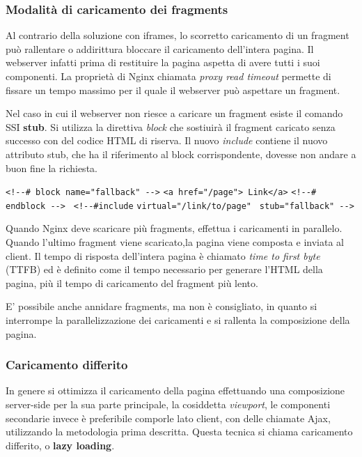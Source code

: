 \subsubsection*{Modalità di caricamento dei fragments}
Al contrario della soluzione con iframes, lo scorretto caricamento di un fragment può rallentare o addirittura bloccare 
il caricamento dell'intera pagina. Il webserver infatti prima di restituire la pagina aspetta di avere tutti  i suoi componenti.
La proprietà di Nginx chiamata \emph{proxy read timeout} permette di fissare un tempo massimo per il quale il webserver 
può aspettare un fragment.

Nel caso in cui il webserver non riesce a caricare un fragment esiste il comando SSI \textbf{stub}.
Si utilizza la direttiva \emph{block} che sostiuirà il fragment caricato senza successo con del codice HTML di riserva.
Il nuovo \emph{include} contiene il nuovo attributo stub, che ha il riferimento al block corrispondente, dovesse non andare
a buon fine la richiesta.


\verb|<!--# block name="fallback" -->|\linebreak
\verb|<a href="/page"> Link</a>|\linebreak
\verb|<!--# endblock -->|\linebreak
\verb| <!--#include|\linebreak
\verb|virtual="/link/to/page"|\linebreak
\verb| stub="fallback" -->|\linebreak

\linebreak
Quando Nginx deve scaricare più fragments, effettua i caricamenti in parallelo.
Quando l'ultimo fragment viene scaricato,la pagina viene composta e inviata al client.
Il tempo di risposta dell'intera pagina è chiamato \emph{time to first byte} (TTFB) ed è definito 
come il tempo necessario per generare l’HTML della pagina, più il tempo di caricamento del fragment più lento.

E' possibile anche annidare fragments, ma non è consigliato, in quanto si 
interrompe la parallelizzazione dei caricamenti e si rallenta la composizione della pagina.

\subsubsection*{Caricamento differito}
In genere si ottimizza il caricamento della pagina effettuando una composizione server-side per la sua parte principale,
 la cosiddetta \emph{viewport}, le componenti secondarie invece è preferibile comporle lato client, con 
delle chiamate Ajax, utilizzando la metodologia prima descritta. Questa tecnica si chiama caricamento differito, o \textbf{lazy loading}.

